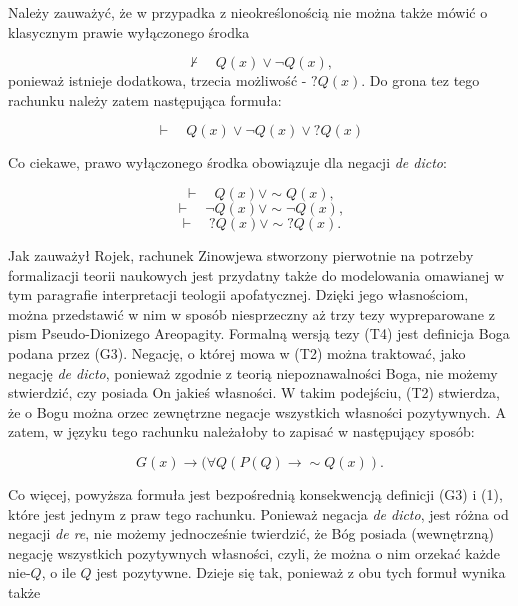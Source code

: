 Należy zauważyć, że w przypadka z nieokreślonością nie można także mówić
o klasycznym prawie wyłączonego środka


\begin{equation}
     \nvdash \quad Q(x) \lor \neg Q(x),
\end{equation}
ponieważ istnieje dodatkowa, trzecia możliwość - $?Q(x)$. Do grona tez tego
rachunku należy zatem następująca formuła:

\begin{equation}
    \vdash \quad Q(x) \lor  \neg Q(x) \lor  ?Q(x)
\end{equation}


Co ciekawe, prawo wyłączonego środka obowiązuje dla negacji \textit{de
dicto}:

\begin{equation}
    \vdash \quad Q(x) \lor  \sim\! Q(x),
\end{equation}
\begin{equation}
    \vdash \quad \neg Q(x) \lor  \sim\! \neg Q(x),
\end{equation}
\begin{equation}
\vdash \quad ?Q(x) \lor  \sim\! ?Q(x).
\end{equation}

Jak zauważył Rojek, rachunek Zinowjewa stworzony pierwotnie na potrzeby
formalizacji teorii naukowych jest przydatny także do modelowania
omawianej w tym paragrafie interpretacji teologii apofatycznej. Dzięki
jego własnościom, można przedstawić w nim w sposób niesprzeczny aż trzy
tezy wypreparowane z pism Pseudo-Dionizego Areopagity. Formalną wersją
tezy (T4) jest definicja Boga podana przez (G3). Negację, o której mowa
w (T2) można traktować, jako negację \textit{de dicto}, ponieważ
zgodnie z teorią niepoznawalności Boga, nie możemy stwierdzić, czy
posiada On jakieś własności. W takim podejściu, (T2) stwierdza, że o
Bogu można orzec zewnętrzne negacje wszystkich własności pozytywnych. A
zatem, w języku tego rachunku należałoby to zapisać w następujący sposób:



\begin{equation}
    G(x) \to  (\forall Q (P(Q) \to  \sim\!Q(x)).
\end{equation}



Co więcej, powyższa formuła jest bezpośrednią konsekwencją definicji
(G3) i (1), które jest jednym z praw tego rachunku. Ponieważ negacja
\textit{de dicto}, jest różna od negacji \textit{de re}, nie możemy
jednocześnie twierdzić, że Bóg posiada (wewnętrzną) negację wszystkich
pozytywnych własności, czyli, że można o nim orzekać każde nie-$Q$, o ile
$Q$ jest pozytywne. Dzieje się tak, ponieważ z obu tych formuł wynika
także


